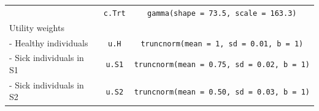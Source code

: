 \documentclass[]{article}
\begin{document}
\begin{longtable}[]{@{}lcc@{}}
\begin{minipage}[t]{0.43\columnwidth}
\end{minipage} & \begin{minipage}[t]{0.18\columnwidth}\centering\strut
\texttt{c.Trt}\strut
\end{minipage} & \begin{minipage}[t]{0.20\columnwidth}\centering\strut
\texttt{gamma(shape\ =\ 73.5,\ scale\ =\ 163.3)}\strut
\end{minipage}\tabularnewline
\begin{minipage}[t]{0.43\columnwidth}\raggedright\strut
Utility weights\strut
\end{minipage} & \begin{minipage}[t]{0.18\columnwidth}\centering\strut
\strut
\end{minipage} & \begin{minipage}[t]{0.20\columnwidth}\centering\strut
\strut
\end{minipage}\tabularnewline
\begin{minipage}[t]{0.43\columnwidth}\raggedright\strut
- Healthy individuals\strut
\end{minipage} & \begin{minipage}[t]{0.18\columnwidth}\centering\strut
\texttt{u.H}\strut
\end{minipage} & \begin{minipage}[t]{0.20\columnwidth}\centering\strut
\texttt{truncnorm(mean\ =\ 1,\ sd\ =\ 0.01,\ b\ =\ 1)}\strut
\end{minipage}\tabularnewline
\begin{minipage}[t]{0.43\columnwidth}\raggedright\strut
- Sick individuals in S1\strut
\end{minipage} & \begin{minipage}[t]{0.18\columnwidth}\centering\strut
\texttt{u.S1}\strut
\end{minipage} & \begin{minipage}[t]{0.20\columnwidth}\centering\strut
\texttt{truncnorm(mean\ =\ 0.75,\ sd\ =\ 0.02,\ b\ =\ 1)}\strut
\end{minipage}\tabularnewline
\begin{minipage}[t]{0.43\columnwidth}\raggedright\strut
- Sick individuals in S2\strut
\end{minipage} & \begin{minipage}[t]{0.18\columnwidth}\centering\strut
\texttt{u.S2}\strut
\end{minipage} & \begin{minipage}[t]{0.20\columnwidth}\centering\strut
\texttt{truncnorm(mean\ =\ 0.50,\ sd\ =\ 0.03,\ b\ =\ 1)}\strut

\end{minipage}
\end{longtable}
\end{document}
